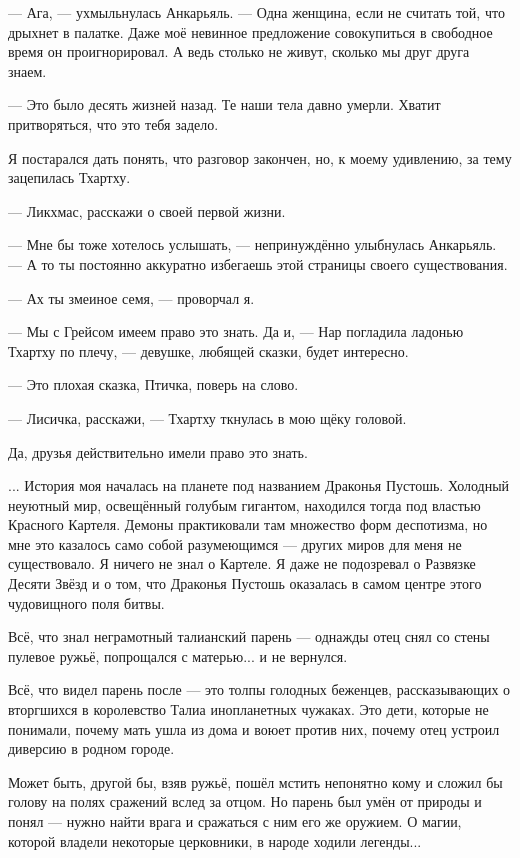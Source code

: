 --- Ага, --- ухмыльнулась Анкарьяль.
--- Одна женщина, если не считать той, что дрыхнет в палатке.
Даже моё невинное предложение совокупиться в свободное время он проигнорировал.
А ведь столько не живут, сколько мы друг друга знаем.

--- Это было десять жизней назад.
Те наши тела давно умерли.
Хватит притворяться, что это тебя задело.

Я постарался дать понять, что разговор закончен, но, к моему удивлению, за тему зацепилась Тхартху.

--- Ликхмас, расскажи о своей первой жизни.

--- Мне бы тоже хотелось услышать, --- непринуждённо улыбнулась Анкарьяль.
--- А то ты постоянно аккуратно избегаешь этой страницы своего существования.

--- Ах ты змеиное семя, --- проворчал я.

--- Мы с Грейсом имеем право это знать.
Да и, --- Нар погладила ладонью Тхартху по плечу, --- девушке, любящей сказки, будет интересно.

--- Это плохая сказка, Птичка, поверь на слово.

--- Лисичка, расскажи, --- Тхартху ткнулась в мою щёку головой.

Да, друзья действительно имели право это знать.

... История моя началась на планете под названием Драконья Пустошь.
Холодный неуютный мир, освещённый голубым гигантом, находился тогда под властью Красного Картеля.
Демоны практиковали там множество форм деспотизма, но мне это казалось само собой разумеющимся --- других миров для меня не существовало.
Я ничего не знал о Картеле.
Я даже не подозревал о Развязке Десяти Звёзд и о том, что Драконья Пустошь оказалась в самом центре этого чудовищного поля битвы.

Всё, что знал неграмотный талианский парень --- однажды отец снял со стены пулевое ружьё, попрощался с матерью... и не вернулся.

Всё, что видел парень после --- это толпы голодных беженцев, рассказывающих о вторгшихся в королевство Талиа инопланетных чужаках.
Это дети, которые не понимали, почему мать ушла из дома и воюет против них, почему отец устроил диверсию в родном городе.

Может быть, другой бы, взяв ружьё, пошёл мстить непонятно кому и сложил бы голову на полях сражений вслед за отцом.
Но парень был умён от природы и понял --- нужно найти врага и сражаться с ним его же оружием.
О магии, которой владели некоторые церковники, в народе ходили легенды...

